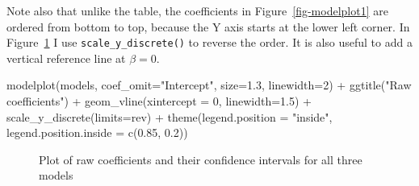 \documentclass[
  letterpaper,
  10pt,
  krantz2]{krantz}
\makeatletter
\newenvironment{Shaded}{\begin{snugshade}}{\end{snugshade}}
\newcommand{\AttributeTok}[1]{\textcolor[rgb]{0.40,0.45,0.13}{#1}}
\newcommand{\DecValTok}[1]{\textcolor[rgb]{0.68,0.00,0.00}{#1}}
\newcommand{\FloatTok}[1]{\textcolor[rgb]{0.68,0.00,0.00}{#1}}
\newcommand{\FunctionTok}[1]{\textcolor[rgb]{0.28,0.35,0.67}{#1}}
\newcommand{\NormalTok}[1]{\textcolor[rgb]{0.00,0.23,0.31}{#1}}
\newcommand{\SpecialCharTok}[1]{\textcolor[rgb]{0.37,0.37,0.37}{#1}}
\newcommand{\StringTok}[1]{\textcolor[rgb]{0.13,0.47,0.30}{#1}}
\newenvironment{kframe}{%
  \medskip{}
  \setlength{\fboxsep}{.8em}
  \def\at@end@of@kframe{}%
  \ifinner\ifhmode%
  \def\at@end@of@kframe{\end{minipage}}%
  \begin{minipage}{\columnwidth}%
  \fi\fi%
  \def\FrameCommand##1{\hskip\@totalleftmargin \hskip-\fboxsep
  \colorbox{shadecolor}{##1}\hskip-\fboxsep
      \hskip-\linewidth \hskip-\@totalleftmargin \hskip\columnwidth}%
  \MakeFramed {\advance\hsize-\width
    \@totalleftmargin\z@ \linewidth\hsize
    \@setminipage}}%
{\par\unskip\endMakeFramed%
  \at@end@of@kframe}
\renewenvironment{Shaded}{\begin{kframe}}{\end{kframe}}
\makeatother
\begin{document}
Note also that unlike the table, the coefficients in
Figure~\ref{fig-modelplot1} are ordered from bottom to top, because the
Y axis starts at the lower left corner. In Figure~\ref{fig-modelplot2} I
use \texttt{scale\_y\_discrete()} to reverse the order. It is also
useful to add a vertical reference line at \(\beta = 0\).

\begin{Shaded}
\begin{Highlighting}[]
\FunctionTok{modelplot}\NormalTok{(models, }
          \AttributeTok{coef\_omit=}\StringTok{"Intercept"}\NormalTok{, }
          \AttributeTok{size=}\FloatTok{1.3}\NormalTok{, }\AttributeTok{linewidth=}\DecValTok{2}\NormalTok{) }\SpecialCharTok{+}
  \FunctionTok{ggtitle}\NormalTok{(}\StringTok{"Raw coefficients"}\NormalTok{) }\SpecialCharTok{+}
  \FunctionTok{geom\_vline}\NormalTok{(}\AttributeTok{xintercept =} \DecValTok{0}\NormalTok{, }\AttributeTok{linewidth=}\FloatTok{1.5}\NormalTok{) }\SpecialCharTok{+}
  \FunctionTok{scale\_y\_discrete}\NormalTok{(}\AttributeTok{limits=}\NormalTok{rev) }\SpecialCharTok{+}
  \FunctionTok{theme}\NormalTok{(}\AttributeTok{legend.position =} \StringTok{"inside"}\NormalTok{,}
        \AttributeTok{legend.position.inside =} \FunctionTok{c}\NormalTok{(}\FloatTok{0.85}\NormalTok{, }\FloatTok{0.2}\NormalTok{))}
\end{Highlighting}
\end{Shaded}

\begin{figure}[H]


\caption{\label{fig-modelplot2}Plot of raw coefficients and their
confidence intervals for all three models}

\end{figure}%
\end{document}
